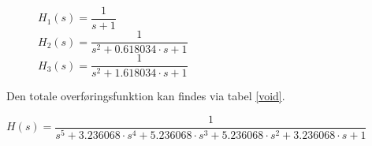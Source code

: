 \begin{figure}
	
\begin{center}
	\begin{itemize}	
 $H_1(s) = \dfrac{1}{s+1}$ \\ 
 $H_2(s) = \dfrac{1}{s^2 + 0.618034\cdot s + 1}$\\
 $H_3(s) = \dfrac{1}{s^2 + 1.618034\cdot s + 1}$\\

	\end{itemize}
\end{center}
\end{figure}

Den totale overføringsfunktion kan findes via tabel \ref{void}.\\ 
\begin{center}
 $H(s) = \dfrac{1}{s^5+3.236068\cdot s^4 + 5.236068\cdot s^3 + 5.236068\cdot s^2 + 3.236068\cdot s +1}$
\end{center}
